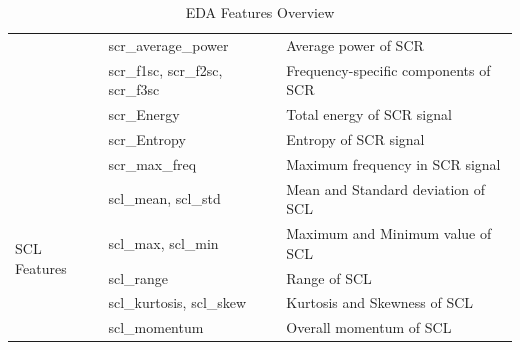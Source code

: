 \begin{table}[H]
{\begin{tabular}{|l|l|l|}
     & scr\_average\_power & Average power of SCR \\
     & scr\_f1sc, scr\_f2sc, scr\_f3sc & Frequency-specific components of SCR \\
     & scr\_Energy & Total energy of SCR signal \\
     & scr\_Entropy & Entropy of SCR signal \\
     & scr\_max\_freq & Maximum frequency in SCR signal \\ \hline
    \multirow{8}{*}{SCL Features} & scl\_mean, scl\_std & Mean and Standard deviation of SCL \\
     & scl\_max, scl\_min & Maximum and Minimum value of SCL \\
     & scl\_range & Range of SCL \\
     & scl\_kurtosis, scl\_skew & Kurtosis and Skewness of SCL \\
     & scl\_momentum & Overall momentum of SCL \\ \hline
    \end{tabular}
    }
    \caption{EDA Features Overview}
    \label{tab:eda_features}
    \end{table}
    
